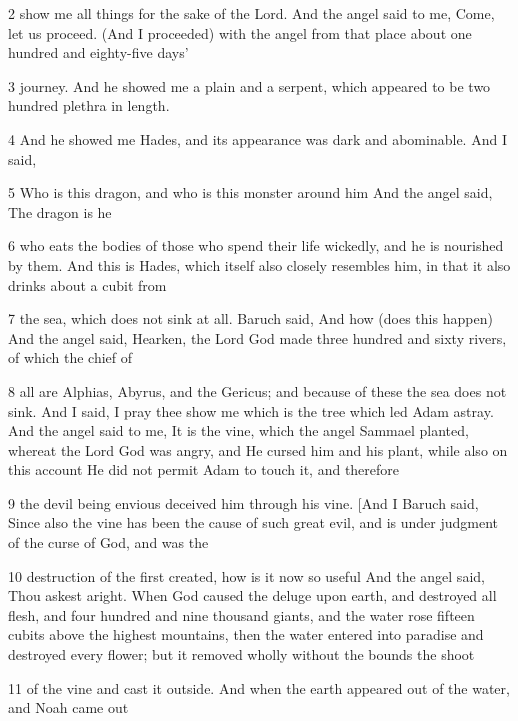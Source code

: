 \par 2 show me all things for the sake of the Lord. And the angel said to me, Come, let us proceed. (And I proceeded) with the angel from that place about one hundred and eighty-five days'

\par 3 journey. And he showed me a plain and a serpent, which appeared to be two hundred plethra in length.

\par 4 And he showed me Hades, and its appearance was dark and abominable. And I said,

\par 5 Who is this dragon, and who is this monster around him And the angel said, The dragon is he

\par 6 who eats the bodies of those who spend their life wickedly, and he is nourished by them. And this is Hades, which itself also closely resembles him, in that it also drinks about a cubit from

\par 7 the sea, which does not sink at all. Baruch said, And how (does this happen) And the angel said, Hearken, the Lord God made three hundred and sixty rivers, of which the chief of

\par 8 all are Alphias, Abyrus, and the Gericus; and because of these the sea does not sink. And I said, I pray thee show me which is the tree which led Adam astray. And the angel said to me, It is the vine, which the angel Sammael planted, whereat the Lord God was angry, and He cursed him and his plant, while also on this account He did not permit Adam to touch it, and therefore

\par 9 the devil being envious deceived him through his vine. [And I Baruch said, Since also the vine has been the cause of such great evil, and is under judgment of the curse of God, and was the

\par 10 destruction of the first created, how is it now so useful And the angel said, Thou askest aright. When God caused the deluge upon earth, and destroyed all flesh, and four hundred and nine thousand giants, and the water rose fifteen cubits above the highest mountains, then the water entered into paradise and destroyed every flower; but it removed wholly without the bounds the shoot

\par 11 of the vine and cast it outside. And when the earth appeared out of the water, and Noah came out

